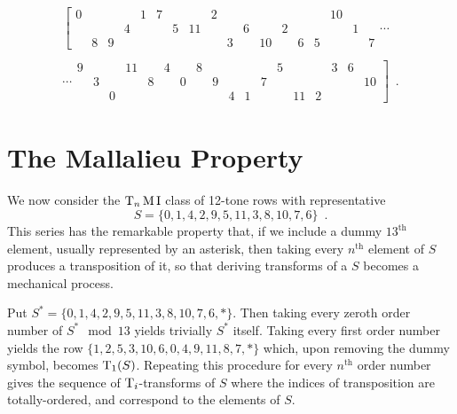 \begin{example}
\begin{multline}
        \left[
        \begin{array}{cccccccccccc|cccccc}
        	0 &&&& 1 & 7 &&& 2 &&&&&&& 10 && \\
        	&&& 4 &&& 5 & 11 &&& 6 && 2 &&&& 1 & \\
        	& 8 & 9 &&&&&&& 3 && 10 && 6 & 5 &&& 7
        \end{array}
        \right. \cdots \\\\
        \cdots \left.
        \begin{array}{cccccc|cccccccccccc}
        	9 &&& 11 && 4 && 8 &&&&& 5 &&& 3 & 6 & \\
        	& 3 &&& 8 && 0 && 9 &&& 7 &&&&&& 10 \\
        	&& 0 &&&&&&& 4 & 1 &&& 11 & 2 &&&
        \end{array}
        \right] \enspace.
    \end{multline}
\end{example}

\section{The Mallalieu Property}
\label{mallalieu-section}

We now consider the $\operatorname{T}_n\operatorname{M}\operatorname{I}$ class of 12-tone rows with representative
\begin{equation}
	S = \{ 0, 1, 4, 2, 9, 5, 11, 3, 8, 10, 7, 6 \} \enspace.
\end{equation}
This series has the remarkable property that, if we include a dummy $13^\text{th}$ element, usually represented by an asterisk, then taking every $n^\text{th}$ element of $S$ produces a transposition of it, so that deriving transforms of a $S$ becomes a mechanical process.

\begin{example}
	Put $S^* = \{ 0, 1, 4, 2, 9, 5, 11, 3, 8, 10, 7, 6, * \}$. Then taking every zeroth order number of $S^* \mod 13$ yields trivially $S^*$ itself. Taking every first order number yields the row $\{ 1, 2, 5, 3, 10, 6, 0, 4, 9, 11, 8, 7, * \}$ which, upon removing the dummy symbol, becomes $\operatorname{T}_1(S)$. Repeating this procedure for every $n^\text{th}$ order number gives the sequence of $\operatorname{T}_i$-transforms of $S$ where the indices of transposition are totally-ordered, and correspond to the elements of $S$.
\end{example}

